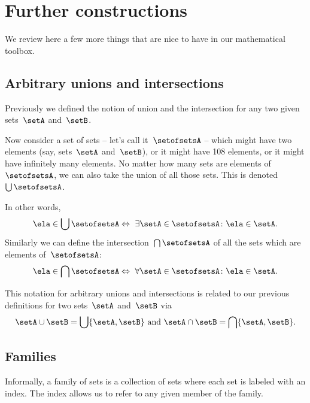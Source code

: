
\section{Further constructions}
\label{sec:more-constructions}

We review here a few more things that are nice to have in our mathematical toolbox.

\subsection{Arbitrary unions and intersections}

Previously we defined the notion of union and the intersection for any two given sets~$\setA$ and~$\setB$.

Now consider a set of sets -- let's call it~$\setofsetsA$ -- which might have two elements (say, sets~$\setA$ and~$\setB$), or it might have 108 elements, or it might have infinitely many elements.
No matter how many sets are elements of~$\setofsetsA$, we can also take the union of all those sets.
This is denoted~$\bigcup \setofsetsA$.

In other words,
%
\begin{equation*}
    \ela \in \bigcup \setofsetsA   \Leftrightarrow \ \exists \setA \in \setofsetsA \colon \ela \in \setA.
\end{equation*}
%
Similarly we can define the intersection~$\bigcap \setofsetsA$ of all the sets which are elements of~$\setofsetsA$:
%
\begin{equation*}
    \ela \in \bigcap \setofsetsA  \Leftrightarrow \  \forall \setA \in \setofsetsA \colon \ela \in \setA.
\end{equation*}

This notation for arbitrary unions and intersections is related to our previous definitions for two sets~$\setA$ and~$\setB$ via
\begin{equation*}
    \setA \cup \setB = \bigcup \{ \setA, \setB \}  \text{ and } \setA \cap \setB = \bigcap \{ \setA, \setB \}.
\end{equation*}

\subsection{Families}

Informally, a family of sets is a collection of sets where each set is labeled with an index.
The index allows us to refer to any given member of the family.

